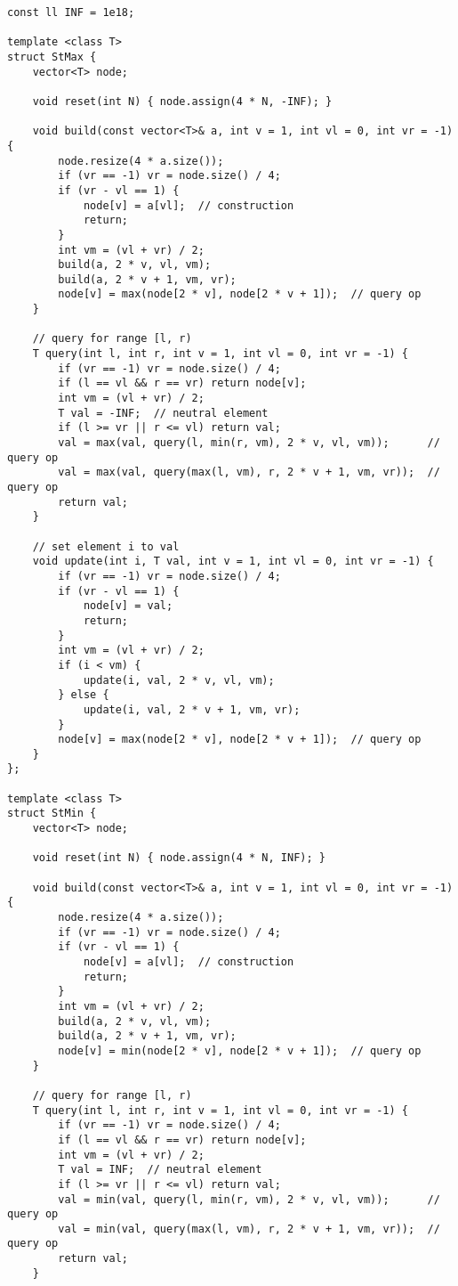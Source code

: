 \documentclass[twoside]{article}
\begin{document}
\begin{multicols*}{2}
\begin{verbatim}
const ll INF = 1e18;

template <class T>
struct StMax {
    vector<T> node;

    void reset(int N) { node.assign(4 * N, -INF); }

    void build(const vector<T>& a, int v = 1, int vl = 0, int vr = -1) {
        node.resize(4 * a.size());
        if (vr == -1) vr = node.size() / 4;
        if (vr - vl == 1) {
            node[v] = a[vl];  // construction
            return;
        }
        int vm = (vl + vr) / 2;
        build(a, 2 * v, vl, vm);
        build(a, 2 * v + 1, vm, vr);
        node[v] = max(node[2 * v], node[2 * v + 1]);  // query op
    }

    // query for range [l, r)
    T query(int l, int r, int v = 1, int vl = 0, int vr = -1) {
        if (vr == -1) vr = node.size() / 4;
        if (l == vl && r == vr) return node[v];
        int vm = (vl + vr) / 2;
        T val = -INF;  // neutral element
        if (l >= vr || r <= vl) return val;
        val = max(val, query(l, min(r, vm), 2 * v, vl, vm));      // query op
        val = max(val, query(max(l, vm), r, 2 * v + 1, vm, vr));  // query op
        return val;
    }

    // set element i to val
    void update(int i, T val, int v = 1, int vl = 0, int vr = -1) {
        if (vr == -1) vr = node.size() / 4;
        if (vr - vl == 1) {
            node[v] = val;
            return;
        }
        int vm = (vl + vr) / 2;
        if (i < vm) {
            update(i, val, 2 * v, vl, vm);
        } else {
            update(i, val, 2 * v + 1, vm, vr);
        }
        node[v] = max(node[2 * v], node[2 * v + 1]);  // query op
    }
};

template <class T>
struct StMin {
    vector<T> node;

    void reset(int N) { node.assign(4 * N, INF); }

    void build(const vector<T>& a, int v = 1, int vl = 0, int vr = -1) {
        node.resize(4 * a.size());
        if (vr == -1) vr = node.size() / 4;
        if (vr - vl == 1) {
            node[v] = a[vl];  // construction
            return;
        }
        int vm = (vl + vr) / 2;
        build(a, 2 * v, vl, vm);
        build(a, 2 * v + 1, vm, vr);
        node[v] = min(node[2 * v], node[2 * v + 1]);  // query op
    }

    // query for range [l, r)
    T query(int l, int r, int v = 1, int vl = 0, int vr = -1) {
        if (vr == -1) vr = node.size() / 4;
        if (l == vl && r == vr) return node[v];
        int vm = (vl + vr) / 2;
        T val = INF;  // neutral element
        if (l >= vr || r <= vl) return val;
        val = min(val, query(l, min(r, vm), 2 * v, vl, vm));      // query op
        val = min(val, query(max(l, vm), r, 2 * v + 1, vm, vr));  // query op
        return val;
    }


\end{verbatim}
\end{multicols*}
\end{document}
